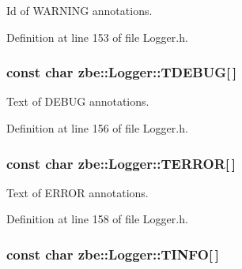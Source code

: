 Id of W\+A\+R\+N\+I\+N\+G annotations. 



Definition at line 153 of file Logger.\+h.

\hypertarget{classzbe_1_1_logger_a3b3e816024fb94bacee114109ce2c462}{}
\subsubsection[{T\+D\+E\+B\+U\+G}]{\setlength{\rightskip}{0pt plus 5cm}const char zbe\+::\+Logger\+::\+T\+D\+E\+B\+U\+G\mbox{[}$\,$\mbox{]}\hspace{0.3cm}{\ttfamily [static]}}\label{classzbe_1_1_logger_a3b3e816024fb94bacee114109ce2c462}


Text of D\+E\+B\+U\+G annotations. 



Definition at line 156 of file Logger.\+h.

\hypertarget{classzbe_1_1_logger_ac0b85a476489ca300a423ddbd1419040}{}
\subsubsection[{T\+E\+R\+R\+O\+R}]{\setlength{\rightskip}{0pt plus 5cm}const char zbe\+::\+Logger\+::\+T\+E\+R\+R\+O\+R\mbox{[}$\,$\mbox{]}\hspace{0.3cm}{\ttfamily [static]}}\label{classzbe_1_1_logger_ac0b85a476489ca300a423ddbd1419040}


Text of E\+R\+R\+O\+R annotations. 



Definition at line 158 of file Logger.\+h.

\hypertarget{classzbe_1_1_logger_a90a7ec362737bacdfb922582cb7e142f}{}
\subsubsection[{T\+I\+N\+F\+O}]{\setlength{\rightskip}{0pt plus 5cm}const char zbe\+::\+Logger\+::\+T\+I\+N\+F\+O\mbox{[}$\,$\mbox{]}\hspace{0.3cm}{\ttfamily [static]}}\label{classzbe_1_1_logger_a90a7ec362737bacdfb922582cb7e142f}


